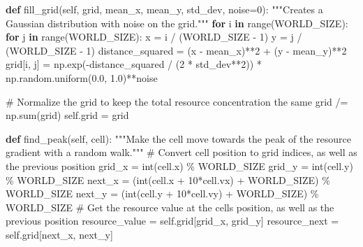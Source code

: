 \documentclass[
  letterpaper,
  DIV=11,
  numbers=noendperiod]{scrreprt}
\newenvironment{Shaded}{\begin{snugshade}}{\end{snugshade}}
\newcommand{\BuiltInTok}[1]{\textcolor[rgb]{0.00,0.23,0.31}{#1}}
\newcommand{\CommentTok}[1]{\textcolor[rgb]{0.37,0.37,0.37}{#1}}
\newcommand{\ControlFlowTok}[1]{\textcolor[rgb]{0.00,0.23,0.31}{\textbf{#1}}}
\newcommand{\DecValTok}[1]{\textcolor[rgb]{0.68,0.00,0.00}{#1}}
\newcommand{\FloatTok}[1]{\textcolor[rgb]{0.68,0.00,0.00}{#1}}
\newcommand{\KeywordTok}[1]{\textcolor[rgb]{0.00,0.23,0.31}{\textbf{#1}}}
\newcommand{\NormalTok}[1]{\textcolor[rgb]{0.00,0.23,0.31}{#1}}
\newcommand{\OperatorTok}[1]{\textcolor[rgb]{0.37,0.37,0.37}{#1}}
\newcommand{\VariableTok}[1]{\textcolor[rgb]{0.07,0.07,0.07}{#1}}
\theoremstyle{definition}
\theoremstyle{remark}
\begin{document}
\begin{tcolorbox}
\begin{Shaded}
\begin{Highlighting}[]
    \KeywordTok{def}\NormalTok{ fill\_grid(}\VariableTok{self}\NormalTok{, grid, mean\_x, mean\_y, std\_dev, noise}\OperatorTok{=}\DecValTok{0}\NormalTok{):}
        \CommentTok{"""Creates a Gaussian distribution with noise on the grid."""}
        \ControlFlowTok{for}\NormalTok{ i }\KeywordTok{in} \BuiltInTok{range}\NormalTok{(WORLD\_SIZE):}
            \ControlFlowTok{for}\NormalTok{ j }\KeywordTok{in} \BuiltInTok{range}\NormalTok{(WORLD\_SIZE):}
\NormalTok{                x }\OperatorTok{=}\NormalTok{ i }\OperatorTok{/}\NormalTok{ (WORLD\_SIZE }\OperatorTok{{-}} \DecValTok{1}\NormalTok{)}
\NormalTok{                y }\OperatorTok{=}\NormalTok{ j }\OperatorTok{/}\NormalTok{ (WORLD\_SIZE }\OperatorTok{{-}} \DecValTok{1}\NormalTok{)}
\NormalTok{                distance\_squared }\OperatorTok{=}\NormalTok{ (x }\OperatorTok{{-}}\NormalTok{ mean\_x)}\OperatorTok{**}\DecValTok{2} \OperatorTok{+}\NormalTok{ (y }\OperatorTok{{-}}\NormalTok{ mean\_y)}\OperatorTok{**}\DecValTok{2}
\NormalTok{                grid[i, j] }\OperatorTok{=}\NormalTok{ np.exp(}\OperatorTok{{-}}\NormalTok{distance\_squared }\OperatorTok{/}\NormalTok{ (}\DecValTok{2} \OperatorTok{*}\NormalTok{ std\_dev}\OperatorTok{**}\DecValTok{2}\NormalTok{)) }\OperatorTok{*}\NormalTok{ np.random.uniform(}\FloatTok{0.0}\NormalTok{, }\FloatTok{1.0}\NormalTok{)}\OperatorTok{**}\NormalTok{noise}

        \CommentTok{\# Normalize the grid to keep the total resource concentration the same}
\NormalTok{        grid }\OperatorTok{/=}\NormalTok{ np.}\BuiltInTok{sum}\NormalTok{(grid)}
        \VariableTok{self}\NormalTok{.grid }\OperatorTok{=}\NormalTok{ grid}
    
    \KeywordTok{def}\NormalTok{ find\_peak(}\VariableTok{self}\NormalTok{, cell):}
        \CommentTok{"""Make the cell move towards the peak of the resource gradient with a random walk."""}
        \CommentTok{\# Convert cell position to grid indices, as well as the previous position}
\NormalTok{        grid\_x }\OperatorTok{=} \BuiltInTok{int}\NormalTok{(cell.x) }\OperatorTok{\%}\NormalTok{ WORLD\_SIZE}
\NormalTok{        grid\_y }\OperatorTok{=} \BuiltInTok{int}\NormalTok{(cell.y) }\OperatorTok{\%}\NormalTok{ WORLD\_SIZE}
\NormalTok{        next\_x }\OperatorTok{=}\NormalTok{ (}\BuiltInTok{int}\NormalTok{(cell.x }\OperatorTok{+} \DecValTok{10}\OperatorTok{*}\NormalTok{cell.vx) }\OperatorTok{+}\NormalTok{ WORLD\_SIZE) }\OperatorTok{\%}\NormalTok{ WORLD\_SIZE }
\NormalTok{        next\_y }\OperatorTok{=}\NormalTok{ (}\BuiltInTok{int}\NormalTok{(cell.y }\OperatorTok{+} \DecValTok{10}\OperatorTok{*}\NormalTok{cell.vy) }\OperatorTok{+}\NormalTok{ WORLD\_SIZE) }\OperatorTok{\%}\NormalTok{ WORLD\_SIZE }
        \CommentTok{\# Get the resource value at the cell\textquotesingle{}s position, as well as the previous position}
\NormalTok{        resource\_value }\OperatorTok{=} \VariableTok{self}\NormalTok{.grid[grid\_x, grid\_y]}
\NormalTok{        resource\_next }\OperatorTok{=} \VariableTok{self}\NormalTok{.grid[next\_x, next\_y]}
        

\end{Highlighting}
\end{Shaded}
\end{tcolorbox}
\end{document}
